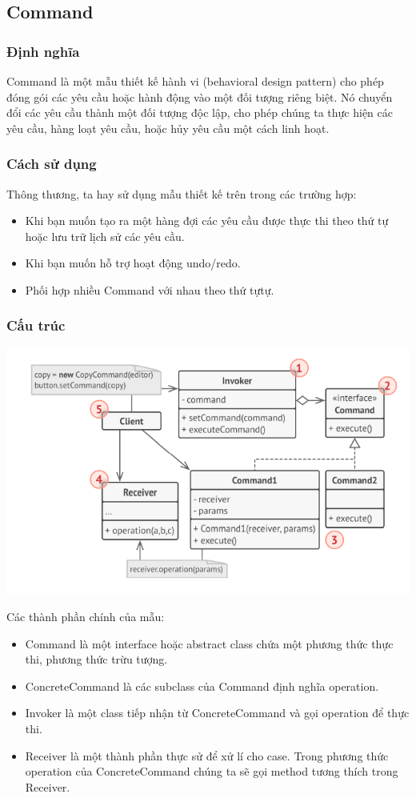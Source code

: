 \subsection{Command}
\subsubsection{Định nghĩa}
Command là một mẫu thiết kế hành vi (behavioral design pattern) cho phép đóng gói các yêu cầu hoặc hành động vào một đối tượng riêng biệt. Nó chuyển đổi các yêu cầu thành một đối tượng độc lập, cho phép chúng ta thực hiện các yêu cầu, hàng loạt yêu cầu, hoặc hủy yêu cầu một cách linh hoạt.
\subsubsection{Cách sử dụng}
Thông thương, ta hay sử dụng mẫu thiết kế trên trong các trường hợp:
\begin{itemize}
    \item Khi bạn muốn tạo ra một hàng đợi các yêu cầu được thực thi theo thứ tự hoặc lưu trữ lịch sử các yêu cầu.
    \item Khi bạn muốn hỗ trợ hoạt động undo/redo.
    \item Phối hợp nhiều Command với nhau theo thứ tựtự.
\end{itemize}
\subsubsection{Cấu trúc}
\begin{center}
    \includegraphics[scale= 0.6]{image/behavioral/command.png}
\end{center}
Các thành phần chính của mẫu:
\begin{itemize}
    \item Command là một interface hoặc abstract class chứa một phương thức thực thi, phương thức trừu tượng.
    \item ConcreteCommand là các subclass của Command định nghĩa operation.
    \item Invoker là một class tiếp nhận từ ConcreteCommand và gọi operation để thực thi.
    \item Receiver là một thành phần thực sử để xử lí cho case. Trong phương thức operation của ConcreteCommand chúng ta sẽ gọi method tương thích trong Receiver.
\end{itemize}
